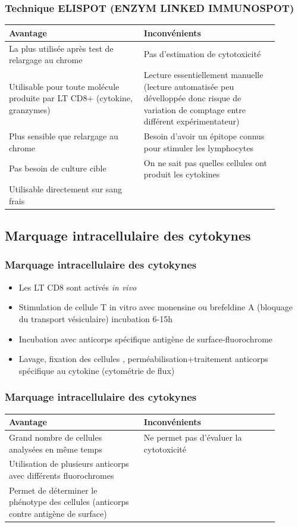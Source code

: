 \documentclass[12pt]{beamer}
\begin{document}
\begin{frame}
	\frametitle{Technique ELISPOT (ENZYM LINKED IMMUNOSPOT)}
	{\footnotesize
	\begin{tabular}{|p{0.45\linewidth}|p{0.45\linewidth}|}
		\hline
	Avantage & Inconvénients\\ 
	\hline
	\hline
	La plus utilisée après test de relargage au chrome & Pas d’estimation de cytotoxicité \\ 
	Utilisable pour toute molécule produite par LT CD8+ (cytokine, granzymes) &  Lecture essentiellement manuelle (lecture automatisée peu dévelloppée donc risque de variation de comptage entre différent expérimentateur)\\ 
	Plus sensible que relargage au chrome & Besoin d'avoir un épitope connus pour stimuler les lymphocytes \\ 
	Pas besoin de culture cible & On ne sait pas quelles cellules ont produit les cytokines \\ 
	Utilisable directement sur sang frais &  \\ 
	\hline
	\end{tabular} 
	}
\end{frame}

\subsection{Marquage intracellulaire des cytokynes}

\begin{frame}
  \transuncover
  \frametitle{Marquage intracellulaire des cytokynes}
  
  \begin{itemize}
  	\item Les LT CD8 sont activés \textit{in vivo}
  	\item Stimulation de cellule T in vitro avec monensine ou brefeldine A (bloquage du transport vésiculaire) incubation 6-15h
  	\item Incubation avec anticorps spécifique antigène de surface-fluorochrome
  	\item Lavage, fixation des cellules , perméabilisation+traitement anticorps spécifique au cytokine (cytométrie de flux)
  \end{itemize}

\end{frame}

\begin{frame}
	\frametitle{Marquage intracellulaire des cytokynes}
	{\footnotesize
		\begin{tabular}{|p{0.45\linewidth}|p{0.45\linewidth}|}
			\hline
			Avantage & Inconvénients\\ 
			\hline
			\hline
			Grand nombre de cellules analysées en même temps & Ne permet pas d’évaluer la cytotoxicité \\ 
			Utilisation de plusieurs anticorps avec différents fluorochromes  &  \\
			Permet de déterminer le phénotype des cellules (anticorps contre antigène de surface) & \\
			\hline
		\end{tabular} 
	}
\end{frame}
\end{document}
